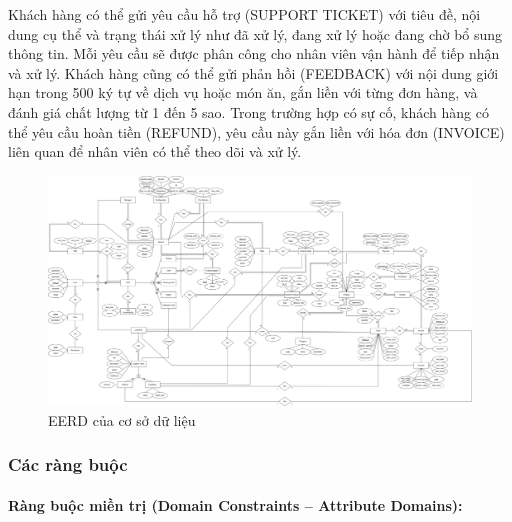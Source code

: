 Khách hàng có thể gửi yêu cầu hỗ trợ (SUPPORT TICKET) với tiêu đề, nội dung cụ thể và trạng thái xử lý như đã xử lý, đang xử lý hoặc đang chờ bổ sung thông tin. Mỗi yêu cầu sẽ được phân công cho nhân viên vận hành để tiếp nhận và xử lý. Khách hàng cũng có thể gửi phản hồi (FEEDBACK) với nội dung giới hạn trong 500 ký tự về dịch vụ hoặc món ăn, gắn liền với từng đơn hàng, và đánh giá chất lượng từ 1 đến 5 sao. Trong trường hợp có sự cố, khách hàng có thể yêu cầu hoàn tiền (REFUND), yêu cầu này gắn liền với hóa đơn (INVOICE) liên quan để nhân viên có thể theo dõi và xử lý.

\begin{landscape}
\begin{figure}[H]
    \centering
    \includegraphics[height=0.85\textheight]{Images/db.png}
    \vspace{0.5cm}
    \caption{EERD của cơ sở dữ liệu}
    \label{fig:my_label}
\end{figure}
\end{landscape}

\subsubsection{Các ràng buộc}
\paragraph{Ràng buộc miền trị (Domain Constraints – Attribute Domains):}

